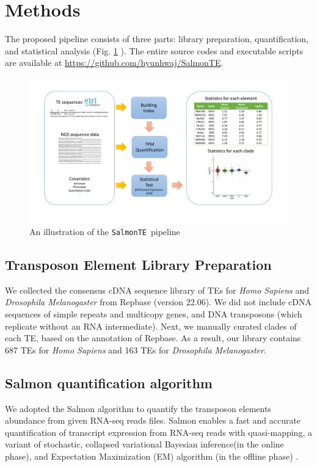 \documentclass{ws-procs11x85}
\newcommand{\SalmonTE}{\texttt{SalmonTE}}
\begin{document}
\section{Methods}

The proposed pipeline consists of three parts: library preparation, quantification, and statistical analysis (Fig. \ref{aba:fig1} ). 
The entire source codes and executable scripts are available at \url{https://github.com/hyunhwaj/SalmonTE}. 

\begin{figure}[!ht]
\centerline{
\includegraphics[width=16cm]{fig1.pdf}
}
\caption{An illustration of the \SalmonTE~pipeline}
\label{aba:fig1}
\end{figure}

\subsection{Transposon Element Library Preparation}
We collected the consensus cDNA sequence library of TEs for \textit{Homo Sapiens} and \textit{Drosophila Melanogaster} from Repbase  
(version 22.06)\cite{repbase}. We did not include cDNA sequences of simple repeats and multicopy genes, and DNA transposons (which replicate without an RNA intermediate). 
Next, we manually curated clades of each TE, based on the annotation of Repbase. As a result, our library contains 687 TEs for \textit{Homo Sapiens} and 163 TEs for \textit{Drosophila Melanogaster}.

\subsection{Salmon quantification algorithm}
We adopted  the Salmon\cite{patro2017salmon} algorithm to quantify the transposon elements abundance from given RNA-seq reads files. Salmon enables a fast and accurate quantification of transcript expression from RNA-seq reads with quasi-mapping, a variant of stochastic, collapsed variational Bayesian inference(in the online phase), and Expectation Maximization (EM) algorithm (in the offline phase)
\cite{patro2017salmon,srivastava2016rapmap,bishop2006pattern,foulds2013stochastic}. 
\end{document}
